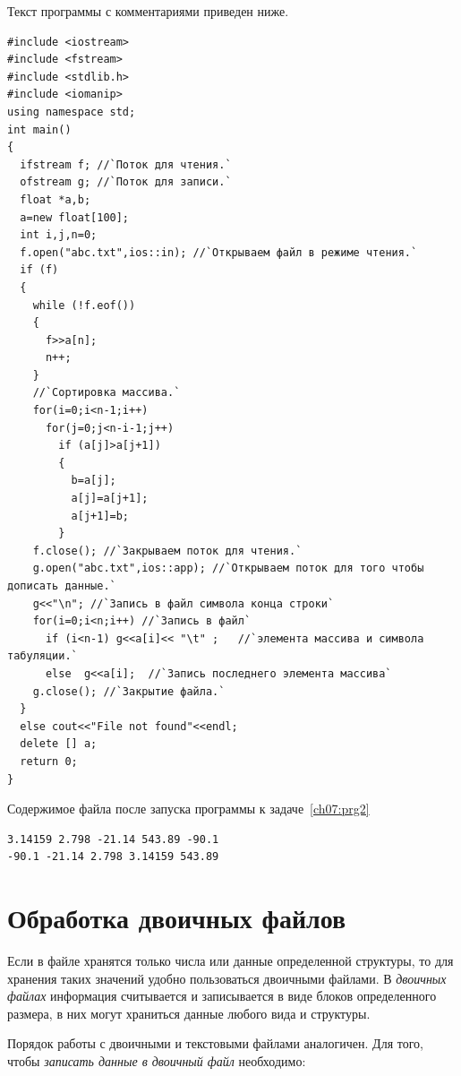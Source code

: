 Текст программы с комментариями приведен ниже. %
\begin{lstlisting}
#include <iostream>
#include <fstream>
#include <stdlib.h>
#include <iomanip>
using namespace std;
int main()
{
  ifstream f; //`Поток для чтения.`
  ofstream g; //`Поток для записи.`
  float *a,b;
  a=new float[100];
  int i,j,n=0;
  f.open("abc.txt",ios::in); //`Открываем файл в режиме чтения.`
  if (f)	
  {
    while (!f.eof())
    {
      f>>a[n];
      n++;
    }
    //`Сортировка массива.`
    for(i=0;i<n-1;i++)
      for(j=0;j<n-i-1;j++)
        if (a[j]>a[j+1])
        {
          b=a[j];
          a[j]=a[j+1];
          a[j+1]=b;
        }
    f.close(); //`Закрываем поток для чтения.`
    g.open("abc.txt",ios::app); //`Открываем поток для того чтобы дописать данные.`
    g<<"\n"; //`Запись в файл символа конца строки` 
    for(i=0;i<n;i++) //`Запись в файл`
      if (i<n-1) g<<a[i]<< "\t" ;	//`элемента массива и символа табуляции.`
      else  g<<a[i];  //`Запись последнего элемента массива`
    g.close(); //`Закрытие файла.`
  }
  else cout<<"File not found"<<endl;
  delete [] a;
  return 0;
}
\end{lstlisting}

Содержимое файла  после запуска программы к задаче~\ref{ch07:prg2}
\begin{verbatim}
3.14159 2.798 -21.14 543.89 -90.1
-90.1 -21.14 2.798 3.14159 543.89
\end{verbatim}


\section[Обработка двоичных файлов]{Обработка двоичных файлов}
Если в файле хранятся только числа или данные определенной структуры, то для хранения таких значений удобно пользоваться
двоичными файлами. В \emph{двоичных файлах} информация считывается и записывается в
виде блоков определенного размера, в них могут храниться данные любого вида и структуры.

Порядок работы с двоичными и текстовыми файлами аналогичен. Для того, чтобы
\emph{записать данные в двоичный файл} необходимо:

